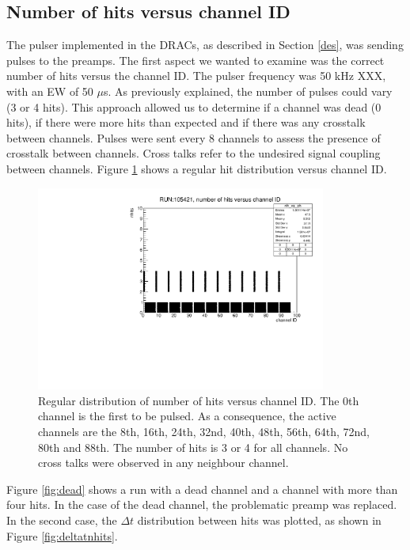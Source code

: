 \subsection{Number of hits versus channel ID}\label{nhitvschid}
The pulser implemented in the DRACs, as described in Section \ref{des}, was sending pulses to the preamps. 
The first aspect we wanted to examine was the correct number of hits versus the channel ID. 
The pulser frequency was 50 kHz XXX, with an EW of 50 $\mu$s. As previously explained, 
the number of pulses could vary (3 or 4 hits). This approach allowed us to determine if a channel was dead (0 hits), 
if there were more hits than expected and if there was any crosstalk between channels. 
Pulses were sent every 8 channels to assess the presence of crosstalk between channels. 
Cross talks refer to the undesired signal coupling between channels. 
Figure \ref{fig:normalhits} shows a regular hit distribution versus channel ID.
\begin{figure}[!h]
      \centering
      \includegraphics[width=0.85\textwidth]{figures/pdf/run105421_nh_vs_ch.pdf}
      \caption{Regular distribution of number of hits versus channel ID. The 0th channel is the first to be pulsed.
      As a consequence, the active channels are the 8th, 16th, 24th, 32nd, 40th, 48th, 56th, 64th, 72nd, 80th and 88th. The number of hits is 3 or 4 for all channels. 
      No cross talks were observed in any neighbour channel.}
     \label{fig:normalhits}
\end{figure}
Figure \ref{fig:dead} shows a run with a dead channel and a channel with more than four hits. 
In the case of the dead channel, the problematic preamp was replaced. In the second case, the 
$\Delta t$ distribution between hits was plotted, as shown in Figure \ref{fig:deltatnhits}.

